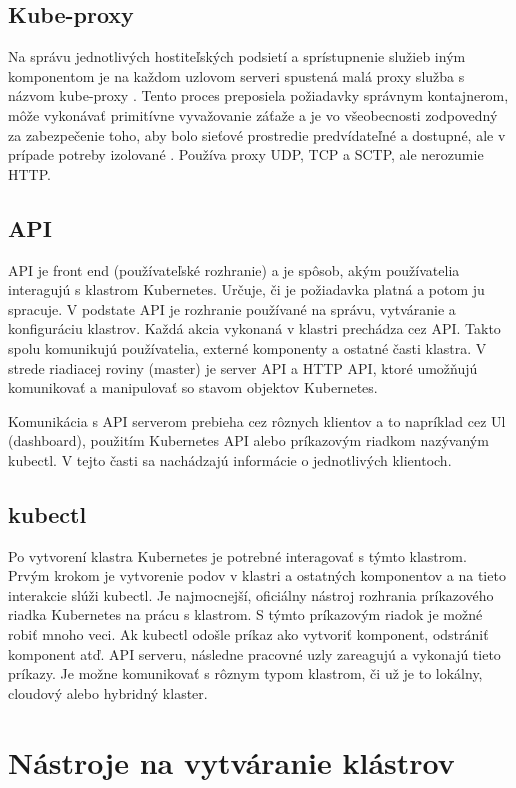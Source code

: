 \subsection*{Kube-proxy}
Na správu jednotlivých hostiteľských podsietí a sprístupnenie služieb iným komponentom je na každom uzlovom serveri spustená malá proxy služba s názvom kube-proxy . Tento proces preposiela požiadavky správnym kontajnerom, môže vykonávať primitívne vyvažovanie záťaže a je vo všeobecnosti zodpovedný za zabezpečenie toho, aby bolo sieťové prostredie predvídateľné a dostupné, ale v prípade potreby izolované \cite{kubeproxy}. Používa proxy UDP, TCP a SCTP, ale nerozumie HTTP.

\subsection{API}

API je front end (používateľské rozhranie) a je spôsob, akým používatelia interagujú s klastrom Kubernetes. Určuje, či je požiadavka platná a potom ju spracuje. V podstate API je rozhranie používané na správu, vytváranie a konfiguráciu klastrov. Každá akcia vykonaná v klastri prechádza cez API. Takto spolu komunikujú používatelia, externé komponenty a ostatné časti klastra. V strede riadiacej roviny (master) je server API a HTTP API, ktoré umožňujú komunikovať a manipulovať so stavom objektov Kubernetes.

Komunikácia s API serverom prebieha cez rôznych klientov a to napríklad cez Ul (dashboard), použitím Kubernetes API alebo príkazovým riadkom nazývaným kubectl. V tejto časti sa nachádzajú informácie o jednotlivých klientoch.

\subsection*{kubectl}

Po vytvorení klastra Kubernetes je potrebné interagovať s týmto klastrom. Prvým krokom je vytvorenie podov v klastri a ostatných komponentov a na tieto interakcie slúži kubectl. Je najmocnejší, oficiálny nástroj rozhrania príkazového riadka Kubernetes na prácu s klastrom. S týmto príkazovým riadok je možné robiť mnoho veci. Ak kubectl odošle príkaz ako vytvoriť komponent, odstrániť komponent atď. API serveru, následne pracovné uzly zareagujú a vykonajú tieto príkazy. Je možne komunikovať s rôznym typom klastrom, či už je to lokálny, cloudový alebo hybridný klaster.

\section{Nástroje na vytváranie klástrov}

